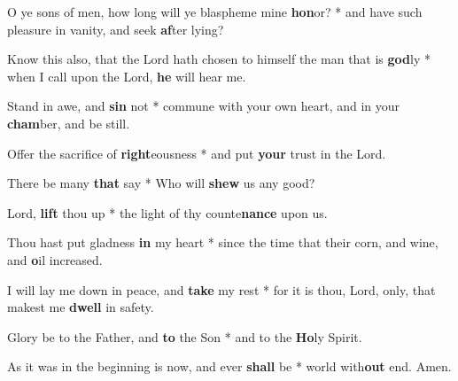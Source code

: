 \begin{multicols}{2}
	O ye sons of men, how long will ye blaspheme mine \textbf{hon}or? * and have such pleasure in vanity, and seek \textbf{af}ter lying?
	
	Know this also, that the Lord hath chosen to himself the man that is \textbf{god}ly * when I call upon the Lord, \textbf{he} will hear me.
	
	Stand in awe, and \textbf{sin} not * commune with your own heart, and in your \textbf{cham}ber, and be still.
	
	Offer the sacrifice of \textbf{right}eousness * and put \textbf{your} trust in the Lord.
	
	There be many \textbf{that} say * Who will \textbf{shew} us any good?
	
	Lord, \textbf{lift} thou up * the light of thy counte\textbf{nance} upon us.
	
	Thou hast put gladness \textbf{in} my heart * since the time that their corn, and wine, and \textbf{o}il increased.
	
	I will lay me down in peace, and \textbf{take} my rest * for it is thou, Lord, only, that makest me \textbf{dwell} in safety.
	
	Glory be to the Father, and \textbf{to} the Son * and to the \textbf{Ho}ly Spirit.
	
	As it was in the beginning is now, and ever \textbf{shall} be * world with\textbf{out} end. Amen.
\end{multicols}